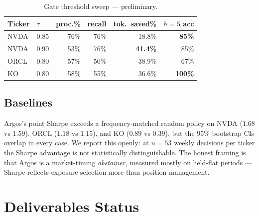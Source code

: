 \documentclass[conference]{IEEEtran}
\begin{document}
\begin{table}[t]
\caption{Gate threshold sweep --- preliminary.}
\label{tab:pareto}
\centering\footnotesize
\begin{tabular}{llrrrr}
\toprule
Ticker & $\tau$ & proc.\% & recall & tok.\ saved\% & $h{=}5$ acc \\
\midrule
NVDA & 0.85 & 76\% & 76\% & 18.8\% & \textbf{85\%} \\
NVDA & 0.90 & 53\% & 76\% & \textbf{41.4\%} & 85\% \\
ORCL & 0.80 & 57\% & 50\% & 38.9\% & 67\% \\
KO   & 0.80 & 58\% & 55\% & 36.6\% & \textbf{100\%} \\
\bottomrule
\end{tabular}
\end{table}

\subsection{Baselines}
Argos's point Sharpe exceeds a frequency-matched random policy on
NVDA ($1.68$ vs $1.59$), ORCL ($1.18$ vs $1.15$), and KO
($0.89$ vs $0.39$), but the $95\%$ bootstrap CIs overlap in every
case. We report this openly: at $n{=}53$ weekly decisions per
ticker the Sharpe advantage is not statistically distinguishable.
The honest framing is that Argos is a market-timing \emph{abstainer},
measured mostly on held-flat periods --- Sharpe reflects exposure
selection more than position management.

\section{Deliverables Status}
\end{document}
